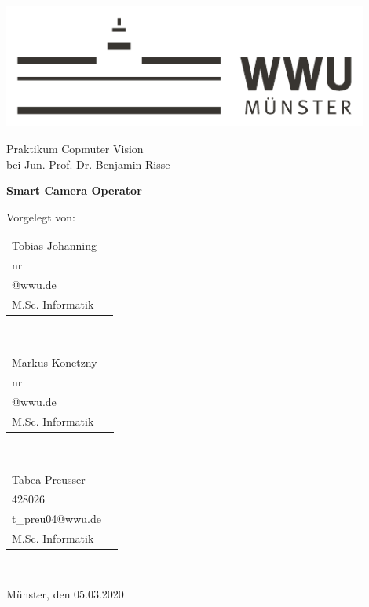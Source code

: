 
\begin{centering}
\vspace{4cm}
\includegraphics[width=12cm]{./img/wwu-logo-neu.pdf}

\vspace{2cm} 

{\large
	Praktikum Copmuter Vision\\[0.5cm]
	bei Jun.-Prof. Dr. Benjamin Risse\\[1cm]
}

{\LARGE
	\textbf{Smart Camera Operator}\\[2cm]
}


{\large
	Vorgelegt von:\\[0.5cm]
}



\begin{minipage}{\textwidth}
\begin{minipage}[c]{0.3\textwidth}
\centering
 \begin{tabular}{ll}
 		Tobias Johanning \\
    	{nr} \\
    	{@wwu.de} \\
    	 M.Sc. Informatik\\
    \end{tabular}\\
\end{minipage}\hfill
\begin{minipage}[c]{0.3\textwidth}
\centering
   \begin{tabular}{ll}
 		Markus Konetzny \\
    	{nr} \\
    	{@wwu.de} \\
    	M.Sc. Informatik\\
    \end{tabular}\\
\end{minipage}\hfill
\begin{minipage}[c]{0.3\textwidth}
\centering
   \begin{tabular}{ll}
 		Tabea Preusser \\
    	{428026} \\
    	{t_preu04@wwu.de} \\
    	M.Sc. Informatik\\
    \end{tabular}\\
\end{minipage}\hfill
\end{minipage}

\vspace{2 cm}
{\large
	Münster, den 05.03.2020\\[1cm]
}
\end{centering}

\vfill


 

